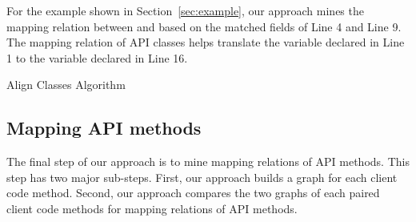 For the example shown in Section~\ref{sec:example}, our approach
mines the mapping relation between  and
 based on the matched fields of Line 4
and Line 9. The mapping relation of API classes helps translate the
variable declared in Line 1 to the variable declared in Line 16.

\begin{algorithm}[t]
\begin{SmallOut}
\dontprintsemicolon
\end{SmallOut}
\label{alg:alignclasses} \caption{Align Classes Algorithm}
\end{algorithm}

\subsection{Mapping API methods}
\label{sec:approach:mappingtypes} The final step of our approach is
to mine mapping relations of API methods. This step has two major
sub-steps. First, our approach builds a graph for each client code
method. Second, our approach compares the two graphs of each paired
client code methods for mapping relations of API methods.

